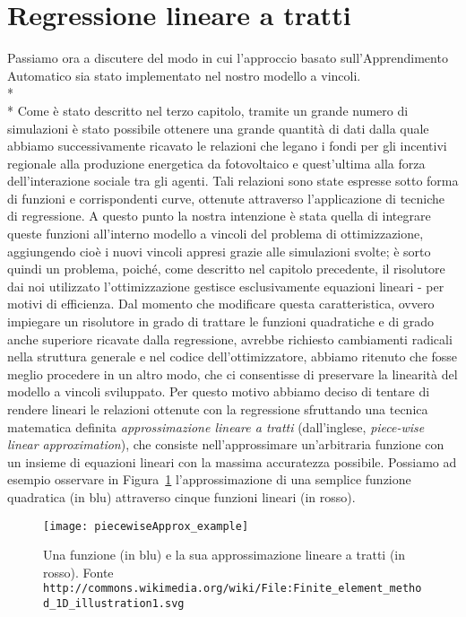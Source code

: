 \section{Regressione lineare a tratti}
Passiamo ora a discutere del modo in cui l'approccio basato sull'Apprendimento Automatico sia stato implementato nel nostro modello a vincoli.
\\*\\*
Come è stato descritto nel terzo capitolo, tramite un grande numero di simulazioni è stato possibile ottenere una grande quantità di dati dalla quale abbiamo successivamente ricavato le relazioni che legano i fondi per gli incentivi regionale alla produzione energetica da fotovoltaico e quest'ultima alla forza dell'interazione sociale tra gli agenti. Tali relazioni sono state espresse sotto forma di funzioni e corrispondenti curve, ottenute attraverso l'applicazione di tecniche di regressione. A questo punto la nostra intenzione è stata quella di integrare queste funzioni all'interno modello a vincoli del problema di ottimizzazione, aggiungendo cioè i nuovi vincoli appresi grazie alle simulazioni svolte; è sorto quindi un problema, poiché, come descritto nel capitolo precedente, il risolutore dai noi utilizzato l'ottimizzazione gestisce esclusivamente equazioni lineari - per motivi di efficienza. Dal momento che modificare questa caratteristica, ovvero impiegare un risolutore in grado di trattare le funzioni quadratiche e di grado anche superiore ricavate dalla regressione, avrebbe richiesto cambiamenti radicali nella struttura generale e nel codice dell'ottimizzatore, abbiamo ritenuto che fosse meglio procedere in un altro modo, che ci consentisse di preservare la linearità del modello a vincoli sviluppato. Per questo motivo abbiamo deciso di tentare di rendere lineari le relazioni  ottenute con la regressione sfruttando una tecnica matematica definita \emph{approssimazione lineare a tratti} \cite{piecewiseApprox,Cattafi} (dall'inglese, \emph{piece-wise linear approximation}), che consiste nell'approssimare un'arbitraria funzione con un insieme di equazioni lineari con la massima accuratezza possibile. 
Possiamo ad esempio osservare in Figura~\ref{piecewiseApprox_example} l'approssimazione di una semplice funzione quadratica (in blu) attraverso cinque funzioni lineari (in rosso). 

\begin{figure}[htb]
	\begin{center}
	\texttt{[image: piecewiseApprox\_example]}
	\end{center}
	\caption{Una funzione (in blu) e la sua approssimazione lineare a tratti (in rosso). Fonte {\tt http://commons.wikimedia.org/wiki/File:Finite\_element\_method\_1D\_illustration1.svg}}
  	\label{piecewiseApprox_example}
\end{figure}

